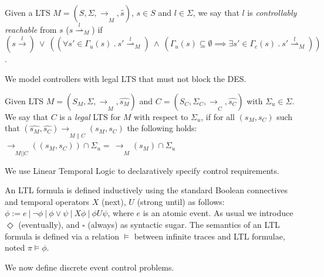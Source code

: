 \begin{definition}
Given a LTS $M = (S, \Sigma, \xrightarrow[]{}_M, \hat{s})$, $s\in S$ and $l \in \Sigma$, we say that $l$ is \textit{controllably reachable} from $s$ ($s \overset{l}\rightharpoonup_M$) if $(s \xrightarrow[]{l}) \ \vee \ ((\forall s'\in \Gamma_u(s) \ . \ s' \overset{l}\rightharpoonup_{M} ) \ \wedge \ (\Gamma_u(s) \subseteq \emptyset \implies \exists s' \in \Gamma_c(s) \ . \ s' \overset{l}\rightharpoonup_{M}))$. 
\end{definition}

We model controllers with legal LTS that must not block the DES.  %

\begin{definition}
    Given LTS $M = (S_M, \Sigma, \xrightarrow[]{}_{M}, \hat{s_M})$ and $C = (S_C, \Sigma_C, \xrightarrow[]{}_{C}, \hat{s_C})$ with $\Sigma_u \in \Sigma$. We say that $C$ is a \textit{legal} LTS for $M$ with respect to $\Sigma_u$, if for all $(s_M, s_C)$ such that  $(\hat{s_M}, \hat{s_C}) \xrightarrow[]{}_{M\|C} (s_M, s_C)$ the following holds: $\xrightarrow[]{}_{M||C}\!((s_M, s_C))  \cap \Sigma_u = \, \xrightarrow[]{}_M\!(s_M)\cap \Sigma_u$
\end{definition}


We use Linear Temporal Logic to declaratively specify control requirements. 

\begin{definition}
    An LTL formula is defined inductively using the standard Boolean connectives and temporal operators $X$ (next), $U$ (strong until) as follows: $\phi := e \ | \ \neg \phi \ | \ \phi \vee \psi \ | \ X \phi \ | \ \phi U \psi$, where $e$ is an atomic event. As usual we introduce $\Diamond$ (eventually), and $\square$ (always) as syntactic sugar. 
    The semantics of an LTL formula is defined via a relation $\models$ between infinite traces and LTL formulae, noted $\pi \models \phi$. 
\end{definition}

We now define discrete event control problems. 

